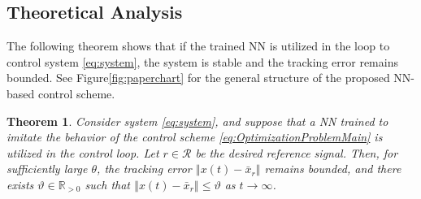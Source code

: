 \documentclass[1p,times]{elsarticle}
\newtheorem{theorem}{Theorem}
\begin{document}
\subsection{Theoretical Analysis}

{{\color{blue}}The following theorem shows that if the trained NN is utilized in the loop to control system \eqref{eq:system}, the system is stable and the tracking error remains bounded.} See Figure\ref{fig:paperchart} for the general structure of the proposed NN-based control scheme. 





\begin{theorem}\label{theorem:NNControl}
{{\color{blue}}Consider system \eqref{eq:system}, and suppose that a NN trained to imitate the behavior of the control scheme \eqref{eq:OptimizationProblemMain} is utilized in the control loop. Let $r\in\mathcal{R}$ be the desired reference signal. Then, for sufficiently large $\theta$, the tracking error $\left\Vert x(t)-\bar{x}_r\right\Vert$ remains bounded, and there exists $\vartheta\in\mathbb{R}_{>0}$ such that $\left\Vert x(t)-\bar{x}_r\right\Vert\leq\vartheta$ as $t\rightarrow\infty$. }
\end{theorem}
\end{document}
